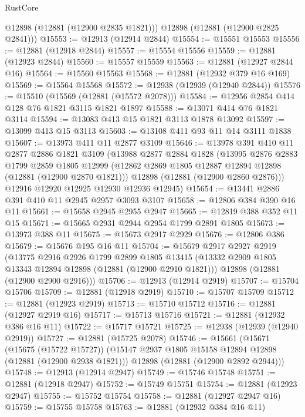 \begin{lexlean}{RustCore}
\begin{coremodule}
        @12898
        (@12881 (@12900 @2835 @1821)))
      @12898
      (@12881 (@12900 @2825 @2841)))
@15553 := @12913 (@12914 @2844)
@15554 := @15551 @15553
@15556 := @12881 (@12918 @2844)
@15557 := @15554 @15556
@15559 := @12881 (@12923 @2844)
@15560 := @15557 @15559
@15563 := @12881 (@12927 @2844 @16)
@15564 := @15560 @15563
@15568 := @12881 (@12932 @379 @16 @169)
@15569 := @15564 @15568
@15572 := @12938 (@12939 (@12940 @2844))
@15576 := @15510 (@15569 (@12881 (@15572 @2078)))
@15584 := @12956 @2854 @414 @128 @76 @1821 @3115 @1821 @1897
@15588 := @13071 @414 @76 @1821 @3114
@15594 := @13083 @413 @15 @1821 @3113 @1878 @13092
@15597 := @13099 @413 @15 @3113
@15603 := @13108 @411 @93 @11 @14 @3111 @1838
@15607 := @13973 @411 @11 @2877 @3109
@15646 := @13978
    @391
    @410
    @11
    @2877
    @2886
    @1821
    @3109
    (@13988
      @2877
      @2884
      @1828
      (@13995
        @2876
        @2883
        @1799
        @2859
        @1805
        @12999
        (@12862 @2869 @1805 @12887 @12894 @12898 (@12881 (@12900 @2870 @1821)))
        @12898
        (@12881 (@12900 @2860 @2876)))
      @12916
      @12920
      @12925
      @12930
      @12936
      @12945)
@15654 := @13441 @2886 @391 @410 @11 @2945 @2957 @3093 @3107
@15658 := @12806 @384 @390 @16 @11
@15661 := @15658 @2945 @2955 @2947
@15665 := @12819 @388 @352 @11 @15
@15671 := @15665 @2931 @2944 @2954 @1799 @2891 @1805
@15673 := @13973 @388 @11
@15675 := @15673 @2917 @2929
@15676 := @12806 @386
@15679 := @15676 @195 @16 @11
@15704 := @15679
    @2917
    @2927
    @2919
    (@13775
      @2916
      @2926
      @1799
      @2899
      @1805
      @13415
      (@13332 @2909 @1805 @13343 @12894 @12898 (@12881 (@12900 @2910 @1821)))
      @12898
      (@12881 (@12900 @2900 @2916)))
@15706 := @12913 (@12914 @2919)
@15707 := @15704 @15706
@15709 := @12881 (@12918 @2919)
@15710 := @15707 @15709
@15712 := @12881 (@12923 @2919)
@15713 := @15710 @15712
@15716 := @12881 (@12927 @2919 @16)
@15717 := @15713 @15716
@15721 := @12881 (@12932 @386 @16 @11)
@15722 := @15717 @15721
@15725 := @12938 (@12939 (@12940 @2919))
@15727 := @12881 (@15725 @2078)
@15746 := @15661
    (@15671
      (@15675 (@15722 @15727))
      (@15147 @2937 @1805 @15158 @12894 @12898 (@12881 (@12900 @2938 @1821)))
      @12898
      (@12881 (@12900 @2892 @2944)))
@15748 := @12913 (@12914 @2947)
@15749 := @15746 @15748
@15751 := @12881 (@12918 @2947)
@15752 := @15749 @15751
@15754 := @12881 (@12923 @2947)
@15755 := @15752 @15754
@15758 := @12881 (@12927 @2947 @16)
@15759 := @15755 @15758
@15763 := @12881 (@12932 @384 @16 @11)

\end{coremodule}
\end{lexlean}
